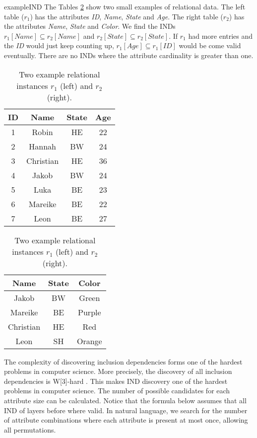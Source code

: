 \begin{restatable}{example}{IND}\label{exmp:IND}
    The Tables \ref{tab:relExamp} show two small examples of relational data. The left table ($r_1$) has the attributes \textit{ID}, \textit{Name}, \textit{State} and \textit{Age}. The right table ($r_2$) has the attributes \textit{Name}, \textit{State} and \textit{Color}. We find the INDs $r_1[Name] \subseteq r_2[Name]$ and $r_2[State] \subseteq r_2[State]$. If $r_1$ had more entries and the \textit{ID} would just keep counting up, $r_1[Age] \subseteq r_1[ID]$ would be come valid eventually. There are no INDs where the attribute cardinality is greater than one.
\end{restatable}

\begin{table}[]
    \centering
    \begin{tabular}{c|c|c|c}
        ID & Name & State & Age \\
        \hline
        1 & Robin & HE & 22 \\
        2 & Hannah & BW & 24 \\
        3 & Christian & HE & 36 \\
        4 & Jakob & BW & 24 \\
        5 & Luka & BE & 23 \\
        6 & Mareike & BE & 22 \\
        7 & Leon & BE & 27 \\
    \end{tabular}
    \begin{tabular}{c|c|c}
        Name & State & Color \\
        \hline
        Jakob & BW & Green \\
        Mareike & BE & Purple \\
        Christian & HE & Red \\
        Leon & SH & Orange \\
    \end{tabular}
    \caption{Two example relational instances $r_1$ (left) and $r_2$ (right).}
    \label{tab:relExamp}
\end{table}

\noindent The complexity of discovering inclusion dependencies forms one of the hardest problems in computer science. More precisely, the discovery of all inclusion dependencies is W[3]-hard \cite{blasius2017parameterized}. This makes IND discovery one of the hardest problems in computer science. The number of possible candidates for each attribute size can be calculated. Notice that the formula below assumes that all IND of layers before where valid. In natural language, we search for the number of attribute combinations where each attribute is present at most once, allowing all permutations.

